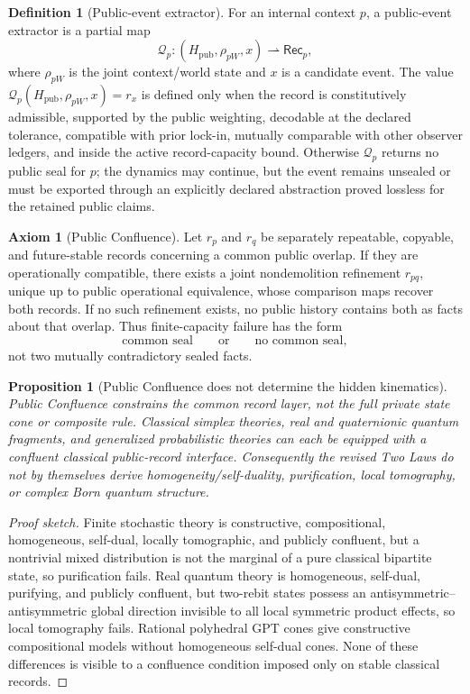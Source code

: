 \documentclass[11pt]{article}
\theoremstyle{plain}
\newtheorem{proposition}[theorem]{Proposition}
\theoremstyle{definition}
\newtheorem{definition}[theorem]{Definition}
\newtheorem{axiom}[theorem]{Axiom}
\theoremstyle{remark}
\newenvironment{proofsketch}{\begin{proof}[Proof sketch]}{\end{proof}}
\begin{document}
\begin{definition}[Public-event extractor]
For an internal context \(p\), a public-event extractor is a partial map
\[
\mathcal{Q}_p:
(H_{\mathrm{pub}},\rho_{pW},x)
\rightharpoonup
\mathsf{Rec}_p,
\]
where \(\rho_{pW}\) is the joint context/world state and \(x\) is a candidate event. The value \(\mathcal{Q}_p(H_{\mathrm{pub}},\rho_{pW},x)=r_x\) is defined only when the record is constitutively admissible, supported by the public weighting, decodable at the declared tolerance, compatible with prior lock-in, mutually comparable with other observer ledgers, and inside the active record-capacity bound. Otherwise \(\mathcal{Q}_p\) returns no public seal for \(p\); the dynamics may continue, but the event remains unsealed or must be exported through an explicitly declared abstraction proved lossless for the retained public claims.
\end{definition}

\begin{axiom}[Public Confluence]
Let \(r_p\) and \(r_q\) be separately repeatable, copyable, and future-stable records concerning a common public overlap. If they are operationally compatible, there exists a joint nondemolition refinement \(r_{pq}\), unique up to public operational equivalence, whose comparison maps recover both records. If no such refinement exists, no public history contains both as facts about that overlap. Thus finite-capacity failure has the form
\[
\text{common seal}
\qquad\text{or}\qquad
\text{no common seal},
\]
not two mutually contradictory sealed facts.
\end{axiom}

\begin{proposition}[Public Confluence does not determine the hidden kinematics]
Public Confluence constrains the common record layer, not the full private state cone or composite rule. Classical simplex theories, real and quaternionic quantum fragments, and generalized probabilistic theories can each be equipped with a confluent classical public-record interface. Consequently the revised Two Laws do not by themselves derive homogeneity/self-duality, purification, local tomography, or complex Born quantum structure.
\end{proposition}

\begin{proofsketch}
Finite stochastic theory is constructive, compositional, homogeneous, self-dual, locally tomographic, and publicly confluent, but a nontrivial mixed distribution is not the marginal of a pure classical bipartite state, so purification fails. Real quantum theory is homogeneous, self-dual, purifying, and publicly confluent, but two-rebit states possess an antisymmetric--antisymmetric global direction invisible to all local symmetric product effects, so local tomography fails. Rational polyhedral GPT cones give constructive compositional models without homogeneous self-dual cones. None of these differences is visible to a confluence condition imposed only on stable classical records.
\end{proofsketch}
\end{document}
